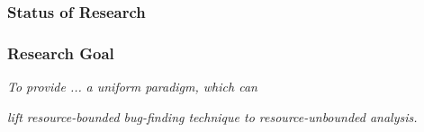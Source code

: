 \documentclass[aspectratio=169]{beamer}
\newcommand{\bhand}{\color{blue}{\ding{43}}}
\begin{document}
\begin{frame}
  \frametitle{Status of Research}
\end{frame}

\begin{frame}
  \frametitle{Research Goal}
  \begin{block}{\textit{To provide ...}}
    \vskip4pt
    {\bhand} \emph{a \alert{uniform} paradigm, which can}
      \begin{center}
        \emph{lift resource-bounded bug-finding technique to \alert{resource-unbounded analysis}.}
      \end{center}
  \end{block}
\end{frame}
\end{document}
